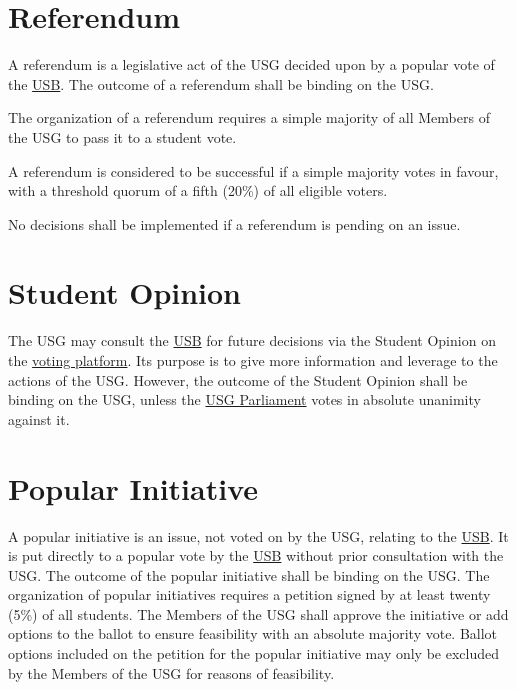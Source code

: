 \section{Referendum}
\label{referendum}
A referendum is a legislative act of the USG decided upon by a popular vote of the \hyperref[studentbody]{USB}. The outcome of a referendum shall be binding on the USG.
\begin{parenum} 
\item
The organization of a referendum requires a simple majority of all Members of the USG to pass it to a student vote. 
\item
A referendum is considered to be successful if a simple majority votes in favour, with a threshold quorum of a fifth (20\%) of all eligible voters.
\item
No decisions shall be implemented if a referendum is pending on an issue.
\end{parenum}


\section{Student Opinion}
\label{StudentOpiniondef}
The USG may consult the \hyperref[studentbody]{USB} for future decisions via the Student Opinion on the \href{https://vote.jacobs.university/}{voting platform}. Its purpose is to give more information and leverage to the actions of the USG. However, the outcome of the Student Opinion shall be binding on the USG, unless the \hyperref[USGParliamentDef]{USG Parliament} votes in absolute unanimity against it.

\section{Popular Initiative} 
 A popular initiative is an issue, not voted on by the USG, relating to the \hyperref[studentbody]{USB}. It is put directly to a popular vote by the \hyperref[studentbody]{USB} without prior consultation with the USG. The outcome of the popular initiative shall be binding on the USG. The organization of popular initiatives requires a petition signed by at least twenty (5\%)  of all students. The Members of the USG shall approve the initiative or add options to the ballot to ensure feasibility with an absolute majority vote. Ballot options included on the petition for the popular initiative may only be excluded by the Members of the USG for reasons of feasibility.

\section{} 


